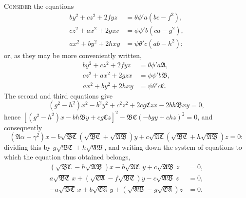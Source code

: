\documentclass[11pt,a4paper]{book}
\begin{document}
\textsc{Consider} the equations
\begin{align*}
by^{2} + cz^{2} + 2fyz &= \theta\phi' a(bc - f^{2}), \\
cz^{2} + ax^{2} + 2gzx &= \phi\psi' b(ca - g^{2}), \\
ax^{2} + by^{2} + 2hxy &= \psi\theta' c(ab - h^{2});
\end{align*}
or, as they may be more conveniently written,
\begin{align*}
by^{2} + cz^{2} + 2fyz &= \theta\phi' a\mathfrak{A}, \\
cz^{2} + ax^{2} + 2gzx &= \phi\psi' b\mathfrak{B}, \\
ax^{2} + by^{2} + 2hxy &= \psi\theta' c\mathfrak{C}.
\end{align*}
The second and third equations give
\[
(g^{2} - h^{2})x^{2} - b^{2}y^{2} + c^{2}z^{2} + 2cg\mathfrak{C}zx - 2bh\mathfrak{B}xy = 0,
\]
hence $[(g^{2} - h^{2})x - bh\mathfrak{B}y + cg\mathfrak{C}z]^{2} - \mathfrak{B}\mathfrak{C}(-bgy + chz)^{2} = 0$, and consequently
\[
(\mathfrak{A}\alpha - \gamma^{2})x - b\sqrt{\mathfrak{B}\mathfrak{C}}(\sqrt{\mathfrak{B}\mathfrak{C}} + \sqrt{\mathfrak{A}\mathfrak{B}})y + c\sqrt{\mathfrak{A}\mathfrak{C}}(\sqrt{\mathfrak{B}\mathfrak{C}} + h\sqrt{\mathfrak{A}\mathfrak{B}})z = 0:
\]
dividing this by $g\sqrt{\mathfrak{B}\mathfrak{C}} + h\sqrt{\mathfrak{A}\mathfrak{B}}$, and writing down the system of equations to which the equation thus obtained belongs,
\begin{align*}
(\sqrt{\mathfrak{B}\mathfrak{C}} - h\sqrt{\mathfrak{A}\mathfrak{B}})x - b\sqrt{\mathfrak{A}\mathfrak{C}}\,y + c\sqrt{\mathfrak{A}\mathfrak{B}}\,z &= 0, \\
a\sqrt{\mathfrak{B}\mathfrak{C}}\,x + (\sqrt{\mathfrak{C}\mathfrak{A}} - f\sqrt{\mathfrak{B}\mathfrak{C}})y - c\sqrt{\mathfrak{A}\mathfrak{B}}\,z &= 0, \\
-a\sqrt{\mathfrak{B}\mathfrak{C}}\,x + b\sqrt{\mathfrak{C}\mathfrak{A}}\,y + (\sqrt{\mathfrak{A}\mathfrak{B}} - g\sqrt{\mathfrak{C}\mathfrak{A}})z &= 0.
\end{align*}

\newpage

\setcounter{page}{466}
\end{document}
